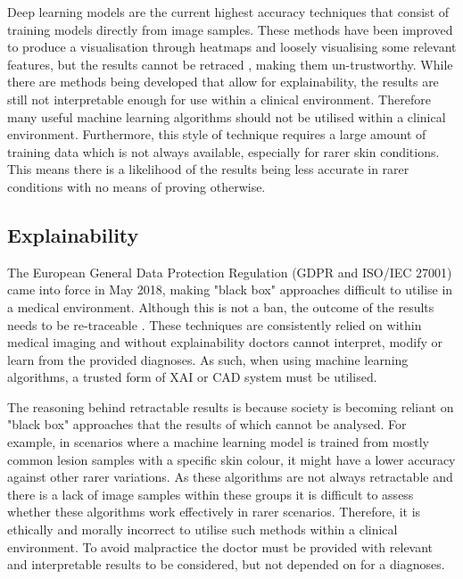 \documentclass[12pt]{report}
\begin{document}
Deep learning models are the current highest accuracy techniques that consist of training models directly from image samples. These methods have been improved to produce a visualisation through heatmaps and loosely visualising some relevant features, but the results cannot be retraced \cite{Kelly2019}, making them un-trustworthy. While there are methods being developed that allow for explainability, the results are still not interpretable\cite{Selvaraju2016} enough for use within a clinical environment. Therefore many useful machine learning algorithms should not be utilised within a clinical environment. Furthermore, this style of technique requires a large amount of training data which is not always available, especially for rarer skin conditions. This means there is a likelihood of the results being less accurate in rarer conditions with no means of proving otherwise.

\subsection{Explainability}
The European General Data Protection Regulation (GDPR and ISO/IEC 27001) came into force in May 2018, making "black box" approaches difficult to utilise in a medical environment. Although this is not a ban, the outcome of the results needs to be re-traceable \cite{Holzinger2017}. These techniques are consistently relied on within medical imaging and without explainability doctors cannot interpret, modify or learn from the provided diagnoses. As such, when using machine learning algorithms, a trusted form of XAI or CAD system must be utilised.

The reasoning behind retractable results is because society is becoming reliant on "black box" approaches that the results of which cannot be analysed. For example, in scenarios where a machine learning model is trained from mostly common lesion samples with a specific skin colour, it might have a lower accuracy against other rarer variations. As these algorithms are not always retractable and there is a lack of image samples within these groups it is difficult to assess whether these algorithms work effectively in rarer scenarios. Therefore, it is ethically and morally incorrect to utilise such methods within a clinical environment. To avoid malpractice the doctor must be provided with relevant and interpretable results to be considered, but not depended on for a diagnoses.
\end{document}
